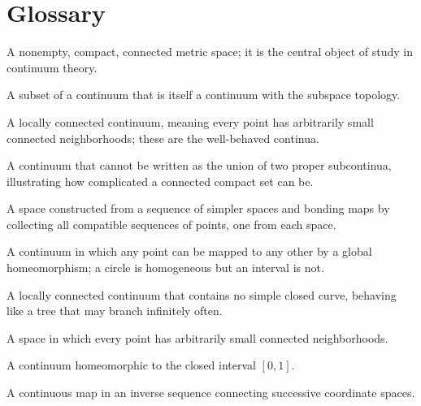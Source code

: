 \theoryapplications
{}
\section*{Glossary}
\begin{description}[leftmargin=*,style=nextline,itemsep=0.3em]
\item[\textbf{Continuum.}] A nonempty, compact, connected metric space; it is the central object of study in continuum theory.
\item[\textbf{Subcontinuum.}] A subset of a continuum that is itself a continuum with the subspace topology.
\item[\textbf{Peano continuum.}] A locally connected continuum, meaning every point has arbitrarily small connected neighborhoods; these are the well-behaved continua.
\item[\textbf{Indecomposable continuum.}] A continuum that cannot be written as the union of two proper subcontinua, illustrating how complicated a connected compact set can be.
\item[\textbf{Inverse limit.}] A space constructed from a sequence of simpler spaces and bonding maps by collecting all compatible sequences of points, one from each space.
\item[\textbf{Homogeneous continuum.}] A continuum in which any point can be mapped to any other by a global homeomorphism; a circle is homogeneous but an interval is not.
\item[\textbf{Dendrite.}] A locally connected continuum that contains no simple closed curve, behaving like a tree that may branch infinitely often.
\item[\textbf{Locally connected.}] A space in which every point has arbitrarily small connected neighborhoods.
\item[\textbf{Arc.}] A continuum homeomorphic to the closed interval $[0,1]$.
\item[\textbf{Bonding map.}] A continuous map in an inverse sequence connecting successive coordinate spaces.
\end{description}

